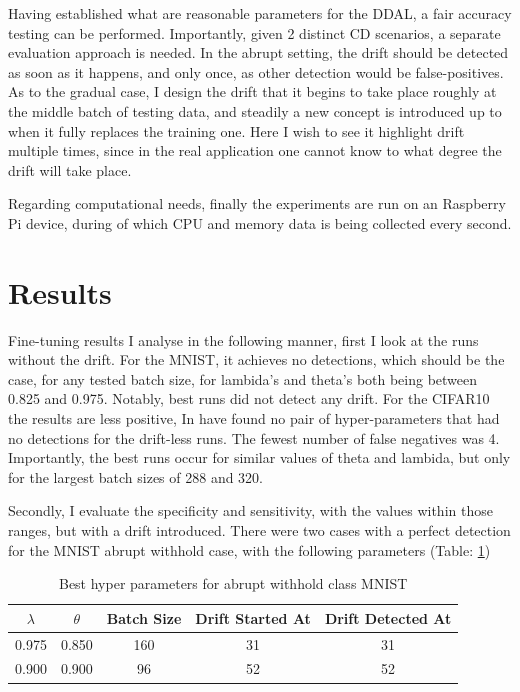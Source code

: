 \documentclass[a4paper]{article}
\begin{document}
Having established what are reasonable parameters for the DDAL, a fair accuracy testing can be performed. Importantly, given 2 distinct CD scenarios, a separate evaluation approach is needed. In the abrupt setting, the drift should be detected as soon as it happens, and only once, as other detection would be false-positives. As to the gradual case, I design the drift that it begins to take place roughly at the middle batch of testing data, and steadily a new concept is introduced up to when it fully replaces the training one. Here I wish to see it highlight drift multiple times, since in the real application one cannot know to what degree the drift will take place.

Regarding computational needs, finally the experiments are run on an Raspberry Pi device, during of which CPU and memory data is being collected every second. 

\section{Results} %
\label{sec:results}

Fine-tuning results I analyse in the following manner, first I look at the runs without the drift. For the MNIST, it achieves no detections, which should be the case, for any tested batch size, for lambida's and theta's both being between 0.825 and 0.975. Notably, best runs did not detect any drift. For the CIFAR10 the results are less positive, In have found no pair of hyper-parameters that had no detections for the drift-less runs. The fewest number of false negatives was 4. Importantly, the best runs occur for similar values of theta and lambida, but only for the largest batch sizes of 288 and 320.

Secondly, I evaluate the specificity and sensitivity, with the values within those ranges, but with a drift introduced. There were two cases with a perfect detection for the MNIST abrupt withhold case, with the following parameters (Table: \ref{tab:best fine tune})

\begin{table}[]
    \centering
    \begin{tabular}{c|c|c|c|c}
        $\lambda$ & $\theta$ & Batch Size & Drift Started At & Drift Detected At \\
        \hline
        0.975 & 0.850 & 160 & 31 & 31 \\
        0.900 & 0.900 & 96 & 52 & 52 \\
    \end{tabular}
    \caption{Best hyper parameters for abrupt withhold class MNIST}
    \label{tab:best fine tune}
\end{table}
\end{document}

